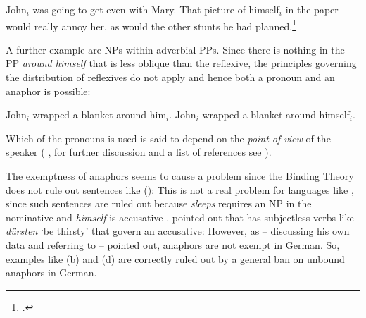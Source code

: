 \documentclass[output=paper
 	        ,biblatex
                ,babelshorthands
                ,newtxmath
                ,draftmode
                ,colorlinks, citecolor=brown
]{langscibook}
\begin{document}
\eanoraggedright
John$_i$ was going to get even with Mary. That picture of himself$_i$
in the paper would really annoy her, as would the other stunts he had planned.\footnote{
        .
}
\z

\noindent
A further example are NPs within adverbial PPs. Since there is nothing in the PP \emph{around
  himself} that is less oblique than the reflexive, the principles governing the distribution of
reflexives do not apply and hence both a pronoun and an anaphor is possible:

\eal
\label{ex-john-wrapped-a-blanket-around-him}
\ex John$_i$ wrapped a blanket around him$_i$.
\ex John$_i$ wrapped a blanket around himself$_i$.
\zl

\noindent
Which of the pronouns is used is said to depend on the \emph{point of view} of the speaker
(%
\citealp{Kuroda1973a-u}, for further discussion and a list of references see \citealp[]{ps2}).


The exemptness of anaphors seems to cause a problem since the Binding Theory does not rule out sentences like ():
\z
This is not a real problem for languages like , since such sentences are ruled out because \emph{sleeps}
requires an NP in the nominative and \emph{himself} is accusative \parencites[]{Brame77}[]{ps2}.
\citet[Section~20.4.6]{Mueller99a} pointed out that  has subjectless verbs like
\emph{dürsten} `be thirsty' that govern an accusative:
\eal
{}
\zl
However, as \citet[, 161]{Kiss2012a} -- discussing his own data and referring to
\citet[]{Frey93a} -- pointed out, anaphors are not exempt in German. So, examples like
(b) and (d) are correctly ruled out by a general ban on unbound anaphors in German.
\end{document}
